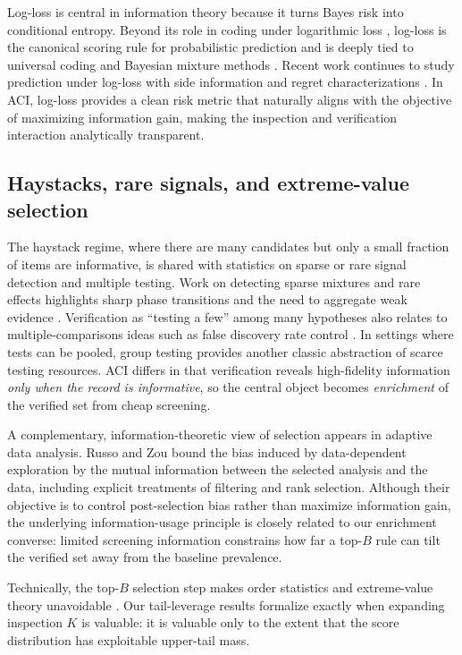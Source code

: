 \documentclass[twocolumn]{scholar7}
\begin{document}
Log-loss is central in information theory because it turns Bayes risk into conditional entropy.
Beyond its role in coding under logarithmic loss \citep{courtade2014multiterminal},
log-loss is the canonical scoring rule for probabilistic prediction and is deeply tied to universal coding and Bayesian mixture methods \citep{clarke1990bayes,merhav1998universal,rissanen1984universal}.
Recent work continues to study prediction under log-loss with side information and regret characterizations \citep{bhatt2021sequential}.
In ACI, log-loss provides a clean risk metric that naturally aligns with the objective of maximizing information gain, making the inspection and verification interaction analytically transparent.

\subsection{Haystacks, rare signals, and extreme-value selection}

The haystack regime, where there are many candidates but only a small fraction of items are informative, is shared with statistics on sparse or rare signal detection and multiple testing.
Work on detecting sparse mixtures and rare effects highlights sharp phase transitions and the need to aggregate weak evidence \citep{donoho2004higher,ingster2003testing}.
Verification as ``testing a few'' among many hypotheses also relates to multiple-comparisons ideas such as false discovery rate control \citep{benjamini1995fdr}.
In settings where tests can be pooled, group testing \citep{dorfman1943group} provides another classic abstraction of scarce testing resources.
ACI differs in that verification reveals high-fidelity information \emph{only when the record is informative},
so the central object becomes \emph{enrichment} of the verified set from cheap screening.

A complementary, information-theoretic view of selection appears in adaptive data analysis.
Russo and Zou \citep{russo2019much} bound the bias induced by data-dependent exploration by the mutual information between the selected analysis and the data, including explicit treatments of filtering and rank selection.
Although their objective is to control post-selection bias rather than maximize information gain, the underlying information-usage principle is closely related to our enrichment converse: limited screening information constrains how far a top-$B$ rule can tilt the verified set away from the baseline prevalence.

Technically, the top-$B$ selection step makes order statistics and extreme-value theory unavoidable \citep{david2003order,embrechts1997modelling}.
Our tail-leverage results formalize exactly when expanding inspection $K$ is valuable: it is valuable only to the extent that the score distribution has exploitable upper-tail mass.
\end{document}
